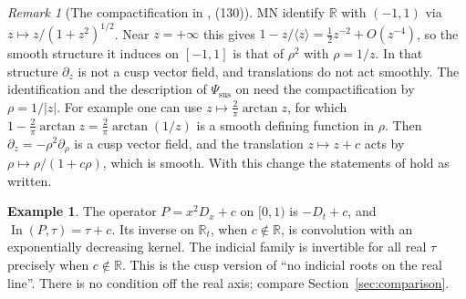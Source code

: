 \documentclass[11pt,oneside,reqno]{article}
\DeclareMathOperator{\In}{In}
\newcommand{\R}{\mathbb R}
\newcommand{\Psis}{\Psi_{\mathrm{sus}}}
\theoremstyle{plain}
\theoremstyle{definition}
\newtheorem{example}[theorem]{Example}
\theoremstyle{remark}
\newtheorem{remark}[theorem]{Remark}
\begin{document}
\begin{remark}[The compactification in \cite{MN}, (130)]\label{rem:SP}
MN identify \(\R\) with \((-1,1)\) via \(z\mapsto z/(1+z^2)^{1/2}\). Near
\(z=+\infty\) this gives \(1-z/\langle z\rangle=\frac12z^{-2}+O(z^{-4})\),
so the smooth structure it induces on \([-1,1]\) is that of \(\rho^2\)
with \(\rho=1/z\). In that structure \(\partial_z\) is not a cusp vector
field, and translations do not act smoothly. The identification
\cite[Prop.~22]{MN} and the description of \(\Psis\) on \cite[p.~44]{MN}
need the compactification by \(\rho=1/|z|\). For example one can use
\(z\mapsto\frac2\pi\arctan z\), for which \(1-\frac2\pi\arctan z=
\frac2\pi\arctan(1/z)\) is a smooth defining function in \(\rho\). Then
\(\partial_z=-\rho^2\partial_\rho\) is a cusp vector field, and the
translation \(z\mapsto z+c\) acts by \(\rho\mapsto\rho/(1+c\rho)\), which
is smooth. With this change the statements of \cite[App.~A]{MN} hold as
written.
\end{remark}

\begin{example}\label{ex:dt}
The operator \(P=x^2D_x+c\) on \([0,1)\) is \(-D_t+c\), and
\(\In(P,\tau)=\tau+c\). Its inverse on \(\R_t\), when \(c\notin\R\), is
convolution with an exponentially decreasing kernel. The indicial family is
invertible for all real \(\tau\) precisely when \(c\notin\R\). This is the
cusp version of ``no indicial roots on the real line''. There is no
condition off the real axis; compare Section~\ref{sec:comparison}.
\end{example}
\end{document}
